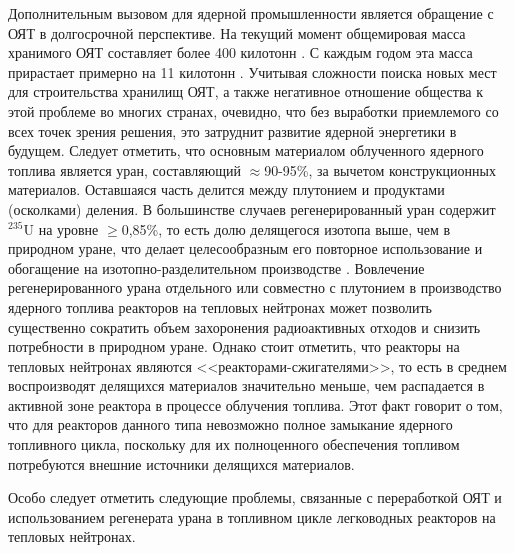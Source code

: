 Дополнительным вызовом для ядерной промышленности является обращение с ОЯТ в долгосрочной перспективе. На текущий момент общемировая масса хранимого ОЯТ составляет более 400 килотонн \cite{kaygorodcevProblemyPerspektivyRazvitiya2021}. С каждым годом эта масса прирастает примерно на 11 килотонн \cite{UseReprocessedUranium2019}. Учитывая сложности поиска новых мест для строительства хранилищ ОЯТ, а также негативное отношение общества к этой проблеме во многих странах, очевидно, что без выработки приемлемого со всех точек зрения решения, это затруднит развитие ядерной энергетики в будущем. 
Следует отметить, что основным материалом облученного ядерного топлива является уран, составляющий $\approx$90-95\%, за вычетом конструкционных материалов. Оставшаяся часть делится между плутонием и продуктами (осколками) деления. В большинстве случаев регенерированный уран содержит $^{235}$U на уровне $\geq$0,85\%, то есть долю делящегося изотопа выше, чем в природном уране, что делает целесообразным его повторное использование и обогащение на изотопно-разделительном производстве  \cite{NikipelovNikipelovSudby}. Вовлечение регенерированного урана отдельного или совместно с плутонием в производство ядерного топлива реакторов на тепловых нейтронах может позволить существенно сократить объем захоронения радиоактивных отходов и снизить потребности в природном уране. Однако стоит отметить, что реакторы на тепловых нейтронах являются <<реакторами-сжигателями>>, то есть в среднем воспроизводят делящихся материалов значительно меньше, чем распадается в активной зоне реактора в процессе облучения топлива. Этот факт говорит о том, что для реакторов данного типа невозможно полное замыкание ядерного топливного цикла, поскольку для их полноценного обеспечения топливом потребуются внешние источники делящихся материалов.

Особо следует отметить следующие проблемы, связанные с переработкой ОЯТ и использованием регенерата урана в топливном цикле легководных реакторов на тепловых нейтронах.

